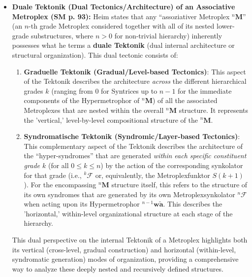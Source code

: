 \documentclass[12pt]{article}
\newcommand{\q}[1]{\enquote{#1}}
\newcommand{\metroplex}[1]{{}^{#1}\mathbf{M}}
\newcommand{\hypermetrophor}[1]{{}^{#1}\mathbf{w\widetilde{a}}}
\newcommand{\metroplexsynkolator}[1]{{}^{#1}\mathcal{F}}
\newcommand{\metroplexfunktor}{S}
\begin{document}
\begin{itemize}
    \item \textbf{Duale Tektonik (Dual Tectonics/Architecture) of an Associative Metroplex (SM p. 93):}
    Heim states that any \q{assoziativer Metroplex \( \metroplex{n} \)} (an \(n\)-th grade Metroplex considered together with all of its nested lower-grade substructures, where \( n > 0 \) for non-trivial hierarchy) inherently possesses what he terms a \textbf{duale Tektonik} (dual internal architecture or structural organization). This dual tectonic consists of:
    \begin{enumerate}
        \item \textbf{Graduelle Tektonik (Gradual/Level-based Tectonics)}: This aspect of the Tektonik describes the architecture \textit{across} the different hierarchical grades \( k \) (ranging from \( 0 \) for Syntrices up to \( n-1 \) for the immediate components of the Hypermetrophor of \( \metroplex{n} \)) of all the associated Metroplexes that are nested within the overall \( \metroplex{n} \) structure. It represents the 'vertical,' level-by-level compositional structure of the \( \metroplex{n} \).
        \item \textbf{Syndromatische Tektonik (Syndromic/Layer-based Tectonics)}: This complementary aspect of the Tektonik describes the architecture of the \q{hyper-syndromes} that are generated \textit{within each specific constituent grade \( k \)} (for all \( 0 \leq k \leq n \)) by the action of the corresponding synkolator for that grade (i.e., \( \metroplexsynkolator{k} \) or, equivalently, the Metroplexfunktor \( \metroplexfunktor(k+1) \)). For the encompassing \( \metroplex{n} \) structure itself, this refers to the structure of its own syndromes that are generated by its own Metroplexsynkolator \( \metroplexsynkolator{n} \) when acting upon its Hypermetrophor \( \hypermetrophor{n-1} \). This describes the 'horizontal,' within-level organizational structure at each stage of the hierarchy.
    \end{enumerate}
    This dual perspective on the internal Tektonik of a Metroplex highlights both its vertical (cross-level, gradual construction) and horizontal (within-level, syndromatic generation) modes of organization, providing a comprehensive way to analyze these deeply nested and recursively defined structures.


\end{itemize}
\end{document}
